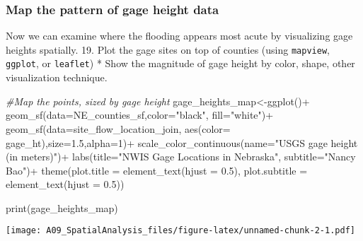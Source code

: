\documentclass[
]{article}
\newenvironment{Shaded}{\begin{snugshade}}{\end{snugshade}}
\newcommand{\AttributeTok}[1]{\textcolor[rgb]{0.77,0.63,0.00}{#1}}
\newcommand{\CommentTok}[1]{\textcolor[rgb]{0.56,0.35,0.01}{\textit{#1}}}
\newcommand{\DecValTok}[1]{\textcolor[rgb]{0.00,0.00,0.81}{#1}}
\newcommand{\FloatTok}[1]{\textcolor[rgb]{0.00,0.00,0.81}{#1}}
\newcommand{\FunctionTok}[1]{\textcolor[rgb]{0.00,0.00,0.00}{#1}}
\newcommand{\NormalTok}[1]{#1}
\newcommand{\OtherTok}[1]{\textcolor[rgb]{0.56,0.35,0.01}{#1}}
\newcommand{\SpecialCharTok}[1]{\textcolor[rgb]{0.00,0.00,0.00}{#1}}
\newcommand{\StringTok}[1]{\textcolor[rgb]{0.31,0.60,0.02}{#1}}
\begin{document}
\hypertarget{map-the-pattern-of-gage-height-data}{%
\subsubsection{Map the pattern of gage height
data}\label{map-the-pattern-of-gage-height-data}}

Now we can examine where the flooding appears most acute by visualizing
gage heights spatially. 19. Plot the gage sites on top of counties
(using \texttt{mapview}, \texttt{ggplot}, or \texttt{leaflet}) * Show
the magnitude of gage height by color, shape, other visualization
technique.

\begin{Shaded}
\begin{Highlighting}[]
\CommentTok{\#Map the points, sized by gage height}
\NormalTok{gage\_heights\_map}\OtherTok{\textless{}{-}}\FunctionTok{ggplot}\NormalTok{()}\SpecialCharTok{+}
                    \FunctionTok{geom\_sf}\NormalTok{(}\AttributeTok{data=}\NormalTok{NE\_counties\_sf,}\AttributeTok{color=}\StringTok{"black"}\NormalTok{,}
                          \AttributeTok{fill=}\StringTok{"white"}\NormalTok{)}\SpecialCharTok{+}
                    \FunctionTok{geom\_sf}\NormalTok{(}\AttributeTok{data=}\NormalTok{site\_flow\_location\_join,}
                                \FunctionTok{aes}\NormalTok{(}\AttributeTok{color=}\NormalTok{ gage\_ht),}\AttributeTok{size=}\FloatTok{1.5}\NormalTok{,}\AttributeTok{alpha=}\DecValTok{1}\NormalTok{)}\SpecialCharTok{+}
                    \FunctionTok{scale\_color\_continuous}\NormalTok{(}\AttributeTok{name=}\StringTok{"USGS gage height (in meters)"}\NormalTok{)}\SpecialCharTok{+}
                    \FunctionTok{labs}\NormalTok{(}\AttributeTok{title=}\StringTok{"NWIS Gage Locations in Nebraska"}\NormalTok{,}
                                   \AttributeTok{subtitle=}\StringTok{"Nancy Bao"}\NormalTok{)}\SpecialCharTok{+}
                    \FunctionTok{theme}\NormalTok{(}\AttributeTok{plot.title =} \FunctionTok{element\_text}\NormalTok{(}\AttributeTok{hjust =} \FloatTok{0.5}\NormalTok{),}
                              \AttributeTok{plot.subtitle =} \FunctionTok{element\_text}\NormalTok{(}\AttributeTok{hjust =} \FloatTok{0.5}\NormalTok{))}

\FunctionTok{print}\NormalTok{(gage\_heights\_map)}
\end{Highlighting}
\end{Shaded}

\texttt{[image: A09\_SpatialAnalysis\_files/figure-latex/unnamed-chunk-2-1.pdf]}
\end{document}
